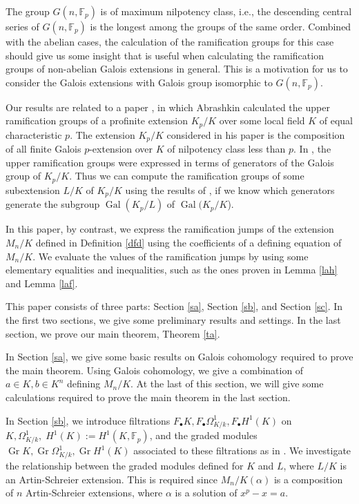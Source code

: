\documentclass[10pt,a4paper]{amsart}
\numberwithin{equation}{section}
\newcommand{\Gr}{\operatorname{Gr}}
\newcommand{\Gal}{\operatorname{Gal}}
\theoremstyle{plain}
\theoremstyle{definition}
\begin{document}
The group $G(n,\mathbb{F}_p)$ is of maximum nilpotency class, i.e., the descending central series of $G(n,\mathbb{F}_p)$ is the longest among the groups of the same order. Combined with the abelian cases, the calculation of the ramification groups for this case should give us some insight that is useful when calculating the ramification groups of non-abelian Galois extensions in general. This is a motivation for us to consider the Galois extensions with Galois group isomorphic to $G(n,\mathbb{F}_p)$.

Our results are related to a paper \cite{Ab}, in which Abrashkin calculated the upper ramification groups of a profinite extension $K_p/K$ over some local field $K$ of equal characteristic $p$. The extension $K_p/K$ considered in his paper is the composition of all finite Galois $p$-extension over $K$ of nilpotency class less than $p$. In \cite{Ab}, the upper ramification groups were expressed in terms of generators of the Galois group of $K_p/K$. Thus we can compute the ramification groups of some subextension $L/K$ of $K_p/K$ using the results of \cite{Ab}, if we know which generators generate the subgroup $\Gal(K_p/L)$ of $\Gal(K_p/K$).

In this paper, by contrast, we express the ramification jumps of the extension $M_n/K$ defined in Definition \ref{dfd} using the coefficients of a defining equation of $M_n/K$. We evaluate the values of the ramification jumps by using some elementary equalities and inequalities, such as the ones proven in Lemma \ref{lah} and Lemma \ref{laf}.

This paper consists of three parts: Section \ref{sa}, Section \ref{sb}, and Section \ref{sc}. In the first two sections, we give some preliminary results and settings. In the last section, we prove our main theorem, Theorem \ref{ta}.

In Section \ref{sa}, we give some basic results on Galois cohomology required to prove the main theorem.
Using Galois cohomology, we give a combination of $a\in K,b\in K^n$ defining $M_n/K$. At the last of this section, we will give some calculations required to prove the main theorem in the last section. %

In Section \ref{sb}, we introduce filtrations $F_\bullet K,F_\bullet \Omega_{K/k}^1,F_\bullet H^1(K)$ on $K,\Omega_{K/k}^1,\;H^1(K):=H^1(K,\mathbb{F}_p)$, and the graded modules $\Gr K,\Gr \Omega_{K/k}^1,\Gr H^1(K)$ associated to these filtrations as in \cite{AS}. We investigate the relationship between the graded modules defined for $K$ and $L$, where $L/K$ is an Artin-Schreier extension. This is required since $M_n/K(\alpha)$ is a composition of $n$ Artin-Schreier extensions, where $\alpha$ is a solution of $x^p-x=a$.
\end{document}
